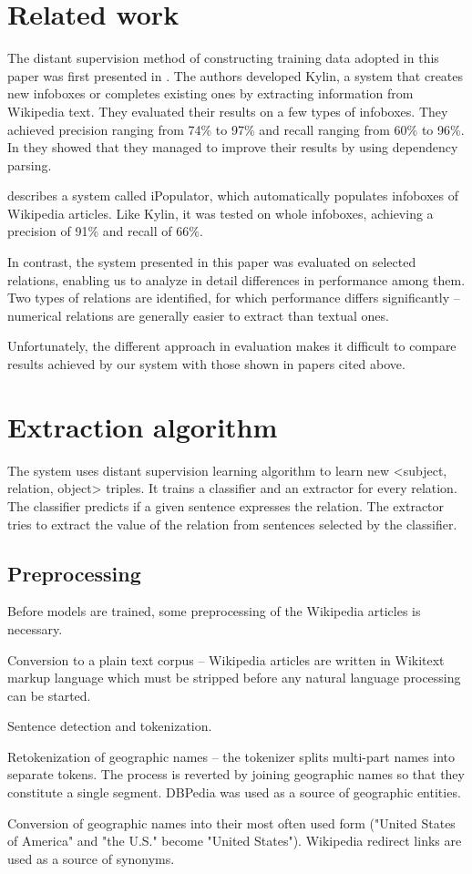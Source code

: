 \documentclass[10pt,a5paper,twoside]{article}
\begin{document}
\section{Related work}
The distant supervision method of constructing training data adopted in this paper was first presented in \cite{ww2007}. The authors developed Kylin, a system that creates new infoboxes or completes existing ones by extracting information from Wikipedia text. They evaluated their results on a few types of infoboxes. They achieved precision ranging from 74\% to 97\% and recall ranging from 60\% to 96\%. In \cite{ww2010} they showed that they managed to improve their results by using dependency parsing.

\cite{lbn2010} describes a system called iPopulator, which automatically populates infoboxes of Wikipedia articles. Like Kylin, it was tested on whole infoboxes, achieving a precision of 91\% and recall of 66\%. 

In contrast, the system presented in this paper was evaluated on selected relations, enabling us to analyze in detail differences in performance among them. Two types of relations are identified, for which performance differs significantly – numerical relations are generally easier to extract than textual ones.

Unfortunately, the different approach in evaluation makes it difficult to compare results achieved by our system with those shown in papers cited above.

\section{Extraction algorithm}
The system uses distant supervision learning algorithm to learn new <subject, relation, object> triples. It trains a classifier and an extractor for every relation. The classifier predicts if a given sentence expresses the relation. The extractor tries to extract the value of the relation from sentences selected by the classifier.

\subsection{Preprocessing}
Before models are trained, some preprocessing of the Wikipedia articles is necessary.
\begin{compactitem}
    \item Conversion to a plain text corpus – Wikipedia articles are written in Wikitext markup language which must be stripped before any natural language processing can be started.
    \item Sentence detection and tokenization.
    \item Retokenization of geographic names – the tokenizer splits multi-part names into separate tokens. The process is reverted by joining geographic names so that they constitute a single segment. DBPedia was used as a source of geographic entities.
    \item Conversion of geographic names into their most often used form ("United States of America" and "the U.S." become "United States"). Wikipedia redirect links are used as a source of synonyms.
\end{compactitem}
\end{document}
